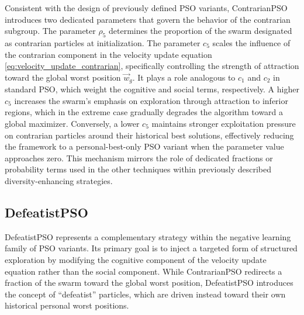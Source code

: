 {Consistent with the design of previously defined PSO variants, ContrarianPSO introduces two dedicated parameters that govern the behavior of the contrarian subgroup.  The parameter $\rho_5$ determines the proportion of the swarm designated as contrarian particles at initialization. The parameter  $c_5$ scales the influence of the contrarian component in the velocity update equation \eqref{eq:velocity_update_contrarian}, specifically controlling the strength of attraction toward the global worst position $\vec{w}_g$. It plays a role analogous to $c_1$ and $c_2$ in standard PSO, which weight the cognitive and social terms, respectively. A higher $c_5$  increases the swarm’s emphasis on exploration through attraction to inferior regions, which in the extreme case gradually degrades the algorithm toward a global maximizer. Conversely, a lower $c_5$ maintains stronger exploitation pressure on contrarian particles around their historical best solutions, effectively reducing the framework to a personal-best-only PSO variant when 
the parameter value approaches zero. This mechanism mirrors the role of dedicated fractions or probability terms used in the other techniques within previously described diversity-enhancing strategies.

















\subsection*{DefeatistPSO}

DefeatistPSO represents a complementary strategy within the negative learning family of PSO variants. Its primary goal is to inject a targeted form of structured exploration by modifying the cognitive component of the velocity update equation rather than the social component. While ContrarianPSO redirects a fraction of the swarm toward the global worst position, DefeatistPSO introduces the concept of ``defeatist'' particles, which are driven instead toward their own historical personal worst positions.


}
